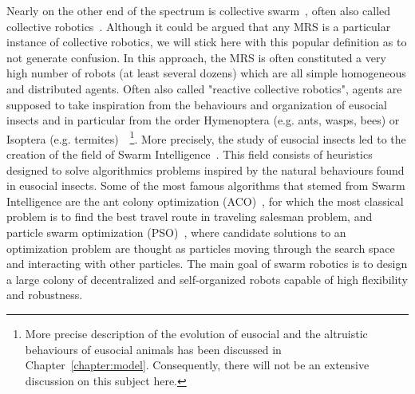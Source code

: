     Nearly on the other end of the spectrum is collective swarm~\cite{Dorigo2014}, often also called collective robotics~\cite{Kube1993, Parker2008}. Although it could be argued that any MRS is a particular instance of collective robotics, we will stick here with this popular definition as to not generate confusion. In this approach, the MRS is often constituted a very high number of robots (at least several dozens) which are all simple homogeneous and distributed agents. Often also called "reactive collective robotics", agents are supposed to take inspiration from the behaviours and organization of eusocial insects and in particular from the order Hymenoptera (e.g. ants, wasps, bees) or Isoptera (e.g. termites)~\cite{Wilson1998, Werfel2014}~\footnote{More precise description of the evolution of eusocial and the altruistic behaviours of eusocial animals has been discussed in Chapter~\ref{chapter:model}. Consequently, there will not be an extensive discussion on this subject here.}. More precisely, the study of eusocial insects led to the creation of the field of Swarm Intelligence~\cite{Bonabeau1999, Zoghby2013}. This field consists of heuristics designed to solve algorithmics problems inspired by the natural behaviours found in eusocial insects. Some of the most famous algorithms that stemed from Swarm Intelligence are the ant colony optimization (ACO)~\cite{Dorigo2004a}, for which the most classical problem is to find the best travel route in traveling salesman problem, and particle swarm optimization (PSO)~\cite{Kennedy1995}, where candidate solutions to an optimization problem are thought as particles moving through the search space and interacting with other particles. The main goal of swarm robotics is to design a large colony of decentralized and self-organized robots capable of high flexibility and robustness.

